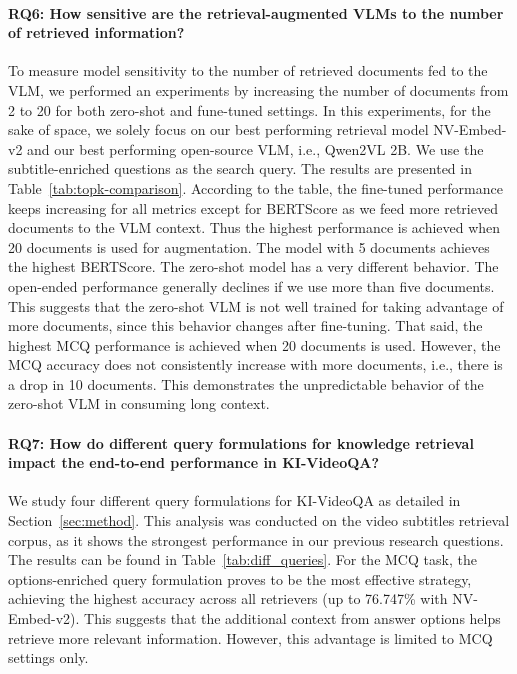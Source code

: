 \paragraph{\textbf{RQ6: How sensitive are the retrieval-augmented VLMs to the number of retrieved information?}}
To measure model sensitivity to the number of retrieved documents fed to the VLM, we performed an experiments by increasing the number of documents from 2 to 20 for both zero-shot and fune-tuned settings. In this experiments, for the sake of space, we solely focus on our best performing retrieval model NV-Embed-v2 and our best performing open-source VLM, i.e., Qwen2VL 2B. We use the subtitle-enriched questions as the search query. The results are presented in Table~\ref{tab:topk-comparison}. According to the table, the fine-tuned performance keeps increasing for all metrics except for BERTScore as we feed more retrieved documents to the VLM context. Thus the highest performance is achieved when 20 documents is used for augmentation. The model with 5 documents achieves the highest BERTScore. The zero-shot model has a very different behavior. The open-ended performance generally declines if we use more than five documents. This suggests that the zero-shot VLM is not well trained for taking advantage of more documents, since this behavior changes after fine-tuning. That said, the highest MCQ performance is achieved when 20 documents is used. However, the MCQ accuracy does not consistently increase with more documents, i.e., there is a drop in 10 documents. This demonstrates the unpredictable behavior of the zero-shot VLM in consuming long context.



\paragraph{\textbf{RQ7: How do different query formulations for knowledge retrieval impact the end-to-end performance in KI-VideoQA?}}
We study four different query formulations for KI-VideoQA as detailed in Section~\ref{sec:method}. This analysis was conducted on the video subtitles retrieval corpus, as it shows the strongest performance in our previous research questions. The results can be found in Table~\ref{tab:diff_queries}. For the MCQ task, the options-enriched query formulation proves to be the most effective strategy, achieving the highest accuracy across all retrievers (up to 76.747\% with NV-Embed-v2). This suggests that the additional context from answer options helps retrieve more relevant information. However, this advantage is limited to MCQ settings only.

